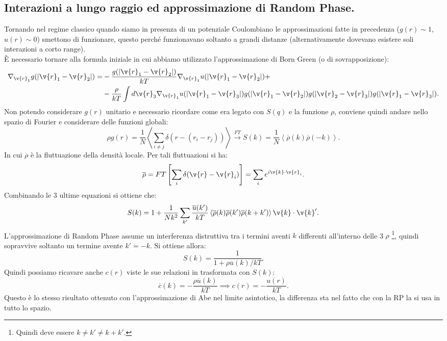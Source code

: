 \subsection{Interazioni a lungo raggio ed approssimazione di Random Phase.}
\label{subsec:Interazioni a lungo raggio.}
Tornando nel regime classico quando siamo in presenza di un potenziale Coulombiano le approssimazioni fatte in precedenza ($g(r)\sim 1$, $u(r)\sim 0$) smettono di funzionare, questo perché funzionavano soltanto a grandi distanze (alternativamente dovevano esistere soli interazioni a corto range).\\
È necessario tornare alla formula iniziale in cui abbiamo utilizzato l'approssimazione di Born Green (o di sovrapposizione):
\[\begin{aligned}
	\nabla_{\v{r}_1}g(\left| \v{r}_1-\v{r}_2 \right| )
	=&
	-\frac{g(\left| \v{r}_1-\v{r}_2 \right|)}{kT}
	\nabla_{\v{r}_1}u(\left| \v{r}_1-\v{r}_2 \right| )+\\
	 &- \frac{\rho }{kT}\int d\v{r}_3\nabla_{\v{r}_1}u(\left| \v{r}_1-\v{r}_3\right| )
	g(\left| \v{r}_1-\v{r}_2 \right| )
	g(\left| \v{r}_2-\v{r}_3 \right| )
	g(\left| \v{r}_1-\v{r}_3 \right| )
.\end{aligned}\]
Non potendo considerare $g(r)$ unitario e necessario ricordare come era legato con $S(q)$ e la funzione $\rho $, conviene quindi andare nello spazio di Fourier e considerare delle funzioni globali:
\[
	\rho g(r)=\frac{1}{N}\left<\sum_{i\neq j}^{} \delta(r-(r_i-r_j)) \right>
	\xrightarrow{FT}
	S(k)= \frac{1}{N}\left< \overline{\rho }(k)\overline{\rho}(-k) \right>
.\] 
In cui $\overline{\rho }$ è la fluttuazione della densità locale. Per tali fluttuazioni si ha:
\[
	\overline{\rho } = FT \left[ \sum_{i}^{} \delta(\v{r}-\v{r}_i) \right]
	= \sum_{i}^{} e^{i\v{k}\cdot\v{r}_i}
.\] 
Combinando le 3 ultime equazioni si ottiene che:
\[
	S(k)
	=
	1+\frac{1}{Nk^2}\sum_{k'}^{} \frac{\overline{u}(k')}{kT}
	\left<\overline{\rho }(k)\overline{\rho }(k')
	\overline{\rho }(k+k') \right>
	\v{k}\cdot\v{k}'
.\] 
L'approssimazione di Random Phase assume un interferenza distruttiva tra i termini aventi $k$ differenti all'interno delle 3 $\rho $ \footnote{Quindi deve essere $k\neq k'\neq k+k'$.}, quindi sopravvive soltanto un termine avente $k'=-k$. Si ottiene allora:
\[
	S(k) = \frac{1}{1+\rho \overline{u}(k)/kT}
.\] 
Quindi possiamo ricavare anche $c(r)$ viste le sue relazioni in trasformata con $S(k)$:
\[
	\overline{c}(k) =- \frac{\rho \overline{u}(k)}{kT} 
	\implies 
	c(r) = - \frac{u(r)}{kT}
.\] 
Questo è lo stesso risultato ottenuto con l'approssimazione di Abe nel limite asintotico, la differenza sta nel fatto che con la RP la si usa in tutto lo spazio.\\
